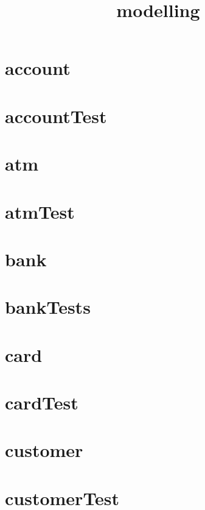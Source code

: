 \documentclass{article}
\begin{document}
\title{modelling}
\author{}
\maketitle
\tableofcontents

\section{account}


\section{accountTest}


\section{atm}


\section{atmTest}


\section{bank}


\section{bankTests}


\section{card}


\section{cardTest}


\section{customer}


\section{customerTest}

\end{document}
